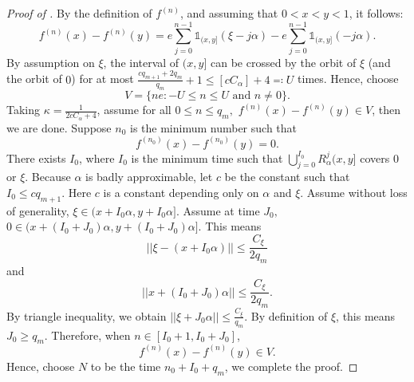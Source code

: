 \documentclass[oneside]{amsart}
\theoremstyle{plain}
\theoremstyle{definition}
\newcommand{\<}{\langle}
\renewcommand{\>}{\rangle}
\renewcommand{\|}{|\!|} %
\begin{document}
\begin{proof} [Proof of ]
By the definition of $f^{(n)}$, and assuming that $0<x<y<1$, it follows:
\begin{equation*}
 f^{(n)}(x)-f^{(n)}(y)=e\sum_{j=0}^{n-1}\mathds{1}_{(x,y]}(\xi-j\alpha)-e\sum_{j=0}^{n-1}\mathds{1}_{(x,y]}(-j\alpha).  
\end{equation*}  
By assumption on \(\xi\), the interval of \((x,y]\) can be crossed by the orbit of \(\xi\) (and the orbit of \(0\)) for at most \(\frac{cq_{m+1}+2q_{m}}{q_{m}}+1\leq [cC_{\alpha}]+4\eqqcolon U\) times. Hence, choose \[V=\{ne: -U\leq n \leq U \text{ and } n\neq 0\}.\]
Taking \(\kappa= \frac{1}{2cC_{\alpha}+4}\),
assume for all \(0\leq n\leq q_m, \) \(f^{(n)}(x)-f^{(n)}(y)\in V\), then we are done. Suppose \(n_0\) is the minimum number such that \[f^{(n_0)}(x)-f^{(n_0)}(y)=0. \]
There exists \(I_0\), where \(I_0\) is the minimum time such that \(\bigcup\limits_{j=0}^{I_0}R_{\alpha}^{j}(x,y]\) covers \(0\) or \(\xi\). Because \(\alpha\) is badly approximable, let \(c\) be the constant such that \(I_0\leq c q_{m+1}.\) Here \(c\) is a constant depending only on \(\alpha\) and \(\xi.\) Assume without loss of generality, \(\xi \in (x+I_0\alpha,y+I_0\alpha].\) Assume at time \(J_0,\) 
\(0\in (x+(I_0+J_0)\alpha,y+(I_0+J_0)\alpha]. \)
This means
\[\|\xi-(x+I_0\alpha)\|\leq \frac{C_{\xi}}{2q_m}\]
and
\[\|x+(I_0+J_0)\alpha\|\leq \frac{C_{\xi}}{2q_m}.\]
By triangle inequality, we obtain 
\(\|\xi+J_0\alpha\|\leq \frac{C_{\xi}}{q_m}.\)
By definition of \(\xi\), this means \(J_0\geq q_m.\)
Therefore, when \(n\in[I_0+1,I_0+J_0]\), \[f^{(n)}(x)-f^{(n)}(y)\in V.\]
Hence, choose \(N\) to be the time \(n_0+I_0+q_m\), we complete the proof.
\end{proof}
\end{document}
